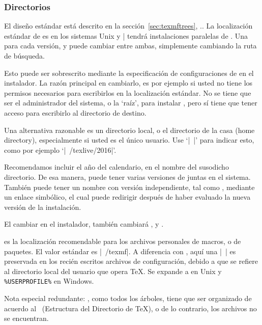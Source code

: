 \documentclass{article}
\begin{document}
\subsubsection{Directorios}
\label{sec:directories}

El diseño estándar está descrito en la sección~\ref{sec:texmftrees},
\p.\pageref{sec:texmftrees}. La localización estándar de
 es  en los sistemas
Unix y |%
tendrá instalaciones paralelas de \TL. Una para cada versión, y puede
cambiar entre ambas, simplemente cambiando la ruta de búsqueda. 

Esto puede ser sobrescrito mediante la especificación de
configuraciones
de  en el instalador. La razón principal en cambiarlo,
es por ejemplo si usted no tiene los permisos necesarios para
escribirlos en la localización estándar. No se tiene que ser el
administrador del sistema, o la `raíz', para instalar \TL, pero sí
tiene que tener acceso para escribirlo al directorio de destino. 

Una alternativa razonable es un directorio local, o el
directorio de la casa (home directory), especialmente si
usted es el único usuario. Use `|~|' para indicar esto, como
por ejemplo `|~/texlive/2016|'.

Recomendamos incluir el año del calendario, en el nombre del susodicho
directorio. De esa manera, puede tener varias versiones de \TL{}
juntas en el sistema. También puede tener un nombre con versión
independiente, tal como , mediante un
enlace simbólico, el cual puede redirigir después de haber evaluado la
nueva versión de la instalación.

El cambiar  en el instalador, también cambiará
,  y
.

 es la localización recomendable para los archivos
personales de macros, o de paquetes. El valor estándar es |~/texmf|. A
diferencia con , aquí una |~| es preservada en los
recién escritos archivos de configuración, debido a que se refiere al
directorio local del usuario que opera \TeX. Se expande a
 en Unix y \verb|%USERPROFILE%| en Windows.  

Nota especial redundante:
, como todos los árboles, tiene que ser organizado
de acuerdo al \TDS\ (Estructura del Directorio de \TeX{}), o de lo contrario, los archivos no se encuentran. 
\end{document}
